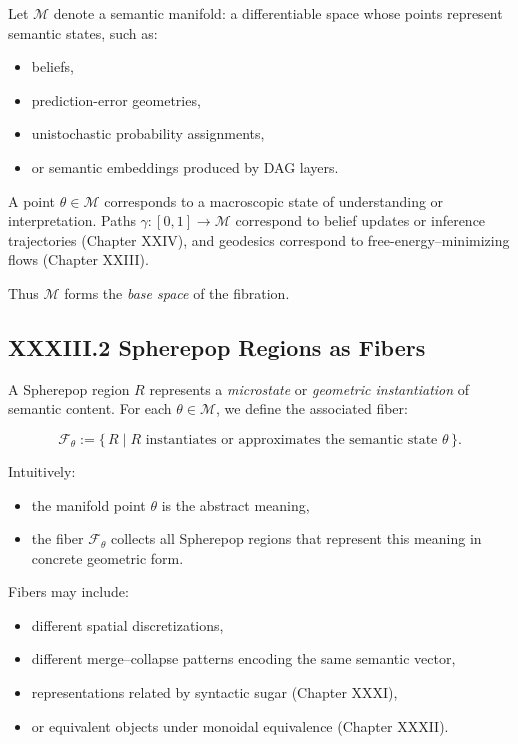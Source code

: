 \documentclass[12pt,letterpaper]{article}
\begin{document}
Let $\mathcal{M}$ denote a semantic manifold: a differentiable space whose points represent semantic states, such as:

\begin{itemize}
    \item beliefs,
    \item prediction-error geometries,
    \item unistochastic probability assignments,
    \item or semantic embeddings produced by DAG layers.
\end{itemize}

A point $\theta \in \mathcal{M}$ corresponds to a macroscopic state of understanding or interpretation. Paths $\gamma : [0,1] \to \mathcal{M}$ correspond to belief updates or inference trajectories (Chapter XXIV), and geodesics correspond to free-energy–minimizing flows (Chapter XXIII).

Thus $\mathcal{M}$ forms the \emph{base space} of the fibration.

\subsection{XXXIII.2 Spherepop Regions as Fibers}

A Spherepop region $R$ represents a \emph{microstate} or \emph{geometric instantiation} of semantic content. For each $\theta \in \mathcal{M}$, we define the associated fiber:

\[
\mathcal{F}_\theta := \{\, R \mid R \text{ instantiates or approximates the semantic state } \theta \,\}.
\]

Intuitively:

\begin{itemize}
    \item the manifold point $\theta$ is the abstract meaning,
    \item the fiber $\mathcal{F}_\theta$ collects all Spherepop regions that represent this meaning in concrete geometric form.
\end{itemize}

Fibers may include:

\begin{itemize}
    \item different spatial discretizations,
    \item different merge--collapse patterns encoding the same semantic vector,
    \item representations related by syntactic sugar (Chapter XXXI),
    \item or equivalent objects under monoidal equivalence (Chapter XXXII).
\end{itemize}
\end{document}
